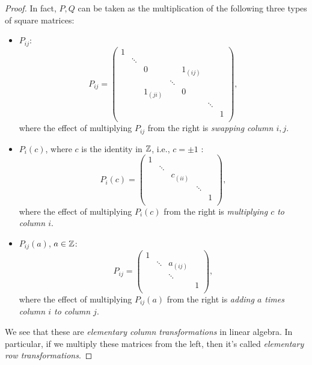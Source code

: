 \begin{proof}
	In fact, \(P, Q\) can be taken as the multiplication of the following three types of square matrices:
	\begin{itemize}
		\item \(P_{ij} \):
		      \[
			      P_{ij} = \begin{pmatrix}
				      1 &        &           &        &           &        &   \\
				        & \ddots &           &        &           &        &   \\
				        &        & 0         &        & 1_{(i j)} &        &   \\
				        &        &           & \ddots &           &        &   \\
				        &        & 1_{(j i)} &        & 0         &        &   \\
				        &        &           &        &           & \ddots &   \\
				        &        &           &        &           &        & 1 \\
			      \end{pmatrix},
		      \]
		      where the effect of multiplying \(P_{ij} \) from the right is \emph{swapping column \(i, j\)}.
		\item \(P_{i}(c) \), where \(c\) is the identity in \(\mathbb{\MakeUppercase{z}} \), i.e., \(c = \pm 1\)  :
		      \[
			      P_{i}(c) = \begin{pmatrix}
				      1 &        &          &        &   \\
				        & \ddots &          &        &   \\
				        &        & c_{(ii)} &        &   \\
				        &        &          & \ddots &   \\
				        &        &          &        & 1 \\
			      \end{pmatrix},
		      \]
		      where the effect of multiplying \(P_{i}(c)\) from the right is \emph{multiplying \(c\) to column \(i\)}.
		\item \(P_{ij}(a) \), \(a\in \mathbb{\MakeUppercase{z}} \):
		      \[
			      P_{ij} = \begin{pmatrix}
				      1 &        &           &   \\
				        & \ddots & a_{(i j)} &   \\
				        &        & \ddots    &   \\
				        &        &           & 1 \\
			      \end{pmatrix},
		      \]
		      where the effect of multiplying \(P_{ij}(a) \) from the right is \emph{adding \(a\) times column \(i\) to column \(j\)}.
	\end{itemize}
	We see that these are \emph{elementary column transformations} in linear algebra. In particular, if we multiply these matrices from the left, then it's called \emph{elementary row transformations}.


\end{proof}
